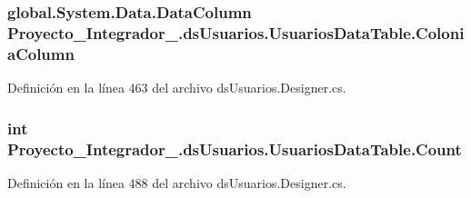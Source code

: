 \hypertarget{class_proyecto___integrador__3_1_1ds_usuarios_1_1_usuarios_data_table_a9279b22c7066920de7247faff42868b2}{
\subsubsection[{Colonia\-Column}]{\setlength{\rightskip}{0pt plus 5cm}global.\-System.\-Data.\-Data\-Column Proyecto\-\_\-\-Integrador\-\_.\-ds\-Usuarios.\-Usuarios\-Data\-Table.\-Colonia\-Column\hspace{0.3cm}{\ttfamily [get]}}}\label{class_proyecto___integrador__3_1_1ds_usuarios_1_1_usuarios_data_table_a9279b22c7066920de7247faff42868b2}


Definición en la línea 463 del archivo ds\-Usuarios.\-Designer.\-cs.

\hypertarget{class_proyecto___integrador__3_1_1ds_usuarios_1_1_usuarios_data_table_add36016d5b2cfdde84930b0621a946e1}{
\subsubsection[{Count}]{\setlength{\rightskip}{0pt plus 5cm}int Proyecto\-\_\-\-Integrador\-\_.\-ds\-Usuarios.\-Usuarios\-Data\-Table.\-Count\hspace{0.3cm}{\ttfamily [get]}}}\label{class_proyecto___integrador__3_1_1ds_usuarios_1_1_usuarios_data_table_add36016d5b2cfdde84930b0621a946e1}


Definición en la línea 488 del archivo ds\-Usuarios.\-Designer.\-cs.

